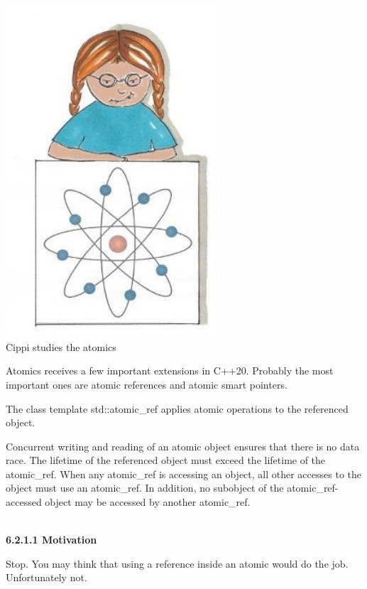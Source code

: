 \begin{center}
\includegraphics[width=0.6\textwidth]{content/3/chapter6/images/7.png}\\
Cippi studies the atomics
\end{center}

Atomics receives a few important extensions in C++20. Probably the most important ones are atomic references and atomic smart pointers.


The class template std::atomic\_ref applies atomic operations to the referenced object.

Concurrent writing and reading of an atomic object ensures that there is no data race. The lifetime of the referenced object must exceed the lifetime of the atomic\_ref. When any atomic\_ref is accessing an object, all other accesses to the object must use an atomic\_ref. In addition, no subobject of the atomic\_ref-accessed object may be accessed by another atomic\_ref.

\hspace*{\fill} \\ %
\noindent
\textbf{6.2.1.1\hspace{0.2cm} Motivation}

Stop. You may think that using a reference inside an atomic would do the job. Unfortunately not.

